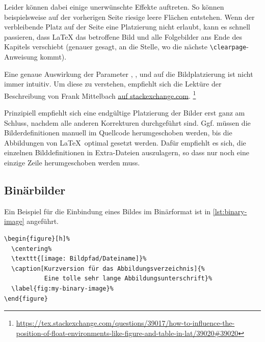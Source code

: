 Leider können dabei einige unerwünschte Effekte auftreten.
So können beispielsweise auf der vorherigen Seite riesige leere Flächen entstehen.
Wenn der verbleibende Platz auf der Seite eine Platzierung nicht erlaubt,
kann es schnell passieren, dass \LaTeX{} das betroffene Bild 
und alle Folgebilder ans Ende des Kapitels verschiebt
(genauer gesagt, an die Stelle, wo die nächste \lstinline|\clearpage|-Anweisung kommt).

Eine genaue Auswirkung der Parameter
, ,  und 
auf die Bildplatzierung ist nicht immer intuitiv.
Um diese zu verstehen, empfiehlt sich die Lektüre der Beschreibung
von Frank Mittelbach
\href{https://tex.stackexchange.com/questions/39017/how-to-influence-the-position-of-float-environments-like-figure-and-table-in-lat/39020#39020}{auf stackexchange.com}.%
\footnote{\url{https://tex.stackexchange.com/questions/39017/how-to-influence-the-position-of-float-environments-like-figure-and-table-in-lat/39020#39020}}

Prinzipiell empfiehlt sich eine endgültige Platzierung der Bilder erst ganz am Schluss,
nachdem alle anderen Korrekturen durchgeführt sind.
Ggf. müssen die Bilderdefinitionen manuell im Quellcode herumgeschoben werden,
bis die Abbildungen von \LaTeX\ optimal gesetzt werden.
Dafür empfiehlt es sich, die einzelnen Bilddefinitionen in Extra-Dateien auszulagern,
so dass nur noch eine einzige Zeile herumgeschoben werden muss.

\subsection[Binärbilder]{Binärbilder}%
\label{sec:Binaerbilder}
%
Ein Beispiel für die Einbindung eines Bildes im Binärformat ist in \cref{lst:binary-image} angeführt.

\begin{lstlisting}[float={htbp},caption={Einbindung einer Binärgrafik in LaTeX},label={lst:binary-image}]
\begin{figure}[h]%
  \centering%
  \texttt{[image: Bildpfad/Dateiname]}%
  \caption[Kurzversion für das Abbildungsverzeichnis]{%
           Eine tolle sehr lange Abbildungsunterschrift}%
  \label{fig:my-binary-image}%
\end{figure}
\end{lstlisting}

